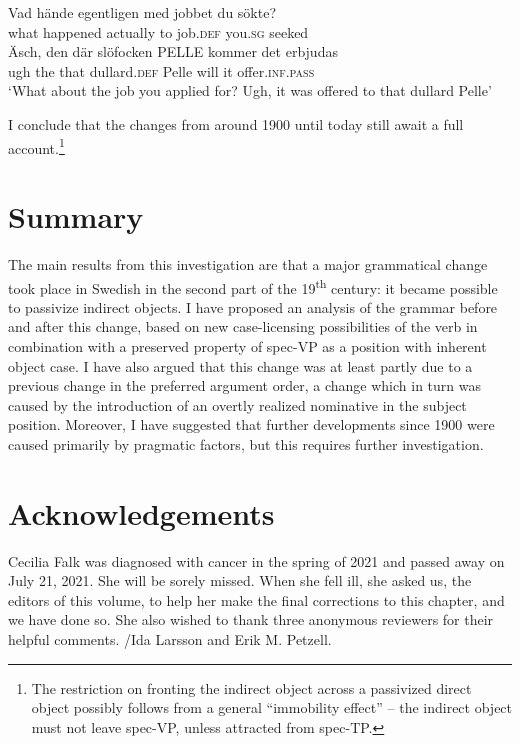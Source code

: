 \documentclass[output=paper]{langscibook}
\begin{document}
\ea%
    \label{ex:falk:28}
\gll Vad    hände    egentligen  med  jobbet    du      sökte?\\
    what    happened  actually    to    job.\textsc{def}  you.\textsc{sg}  seeked\\

\gll Äsch,  den  där  slöfocken    PELLE  kommer  det  erbjudas\\
    ugh    the  that  dullard.\textsc{def}    Pelle    will      it    offer.\textsc{inf.pass}\\
\glt ‘What about the job you applied for? Ugh, it was offered to that dullard Pelle’
\z



I conclude that the changes from around 1900 until today still await a full account.\footnote{The restriction on fronting the indirect object across a passivized direct object possibly follows from a general “immobility effect” – the indirect object must not leave spec-VP, unless attracted from spec-TP.}

\section{Summary}\label{sec:falk:6}


The main results from this investigation are that a major grammatical change took place in Swedish in the second part of the 19\textsuperscript{th} century: it became possible to passivize indirect objects. I have proposed an analysis of the grammar before and after this change, based on new case-licensing possibilities of the verb in combination with a preserved property of spec-VP as a position with inherent object case. I have also argued that this change was at least partly due to a previous change in the preferred argument order, a change which in turn was caused by the introduction of an overtly realized nominative in the subject position. Moreover, I have suggested that further developments since 1900 were caused primarily by pragmatic factors, but this requires further investigation.

\section*{Acknowledgements}


Cecilia Falk was diagnosed with cancer in the spring of 2021 and passed away on July 21, 2021. She will be sorely missed. When she fell ill, she asked us, the editors of this volume, to help her make the final corrections to this chapter, and we have done so. She also wished to thank three anonymous reviewers for their helpful comments. /Ida Larsson and Erik M. Petzell.  
\end{document}
